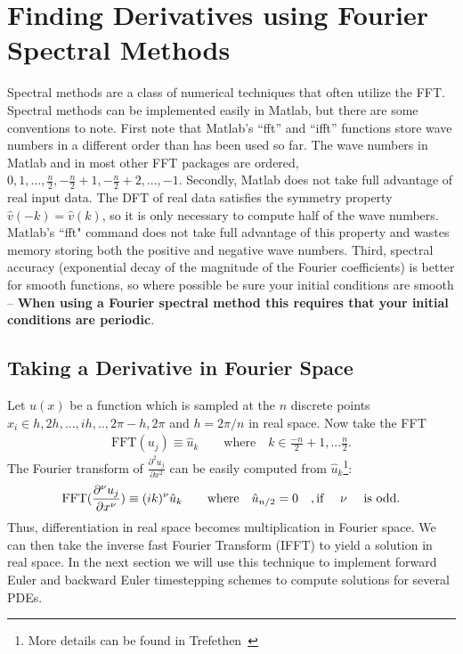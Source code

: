 \chapter{Finding Derivatives using Fourier Spectral Methods}
Spectral methods are a class of numerical techniques that often utilize the FFT. Spectral methods can be implemented easily in Matlab, but there are some conventions to note. First note that Matlab's ``fft'' and ``ifft'' functions store wave numbers in a different order than has been used so far. The wave numbers in Matlab and in most other FFT packages are ordered, $0,1,...,\frac{n}{2},-\frac{n}{2}+1,-\frac{n}{2}+2,...,-1$. Secondly, Matlab does not take full advantage of real input data. The DFT of real data satisfies the symmetry property $\hat{v}(-k)=\hat{v}(k)$, so it is only necessary to compute half of the wave numbers. Matlab's ``fft" command does not take full advantage of this property and wastes memory storing both the positive and negative wave numbers. Third, spectral accuracy (exponential decay of the magnitude of the Fourier coefficients) is better for smooth functions, so where possible be sure your initial conditions are smooth -- \textbf{When using a Fourier spectral method this requires that your initial conditions are periodic}.
\section{Taking a Derivative in Fourier Space}
Let $u(x)$ be a function which is sampled at the $n$ discrete points $x_i \in {h,2h,...,ih,..,2\pi-h,2\pi}$ and $h=2\pi/n$ in real space. Now take the FFT
\begin{eqnarray}
\text{FFT}(u_j) \equiv \hat{u}_k \qquad \text{where} \quad k \in {\frac{-n}{2}+1,...\frac{n}{2}}.
\end{eqnarray}
The Fourier transform of $\frac{\partial^2 u_j}{\partial x^2}$ can be easily computed from $\hat{u}_k$\footnote{More details can be found in Trefethen~\cite[Chap. 3]{Tre00}}:
\begin{eqnarray}
\textrm{FFT}(\frac{\partial^\nu u_j}{\partial x^\nu}) \equiv (ik)^\nu \hat{u}_k \qquad \text{where} \quad \hat{u}_{n/2}=0 \quad, \text{if \quad $\nu$ \quad \text{is odd}}. \label{eq:Spectral_Method_Deriv}
\end{eqnarray}
Thus, differentiation in real space becomes multiplication in Fourier space. We can then take the inverse fast Fourier Transform (IFFT) to yield a solution in real space. In the next section we will use this technique to implement forward Euler and backward Euler timestepping schemes to compute solutions for several PDEs.

